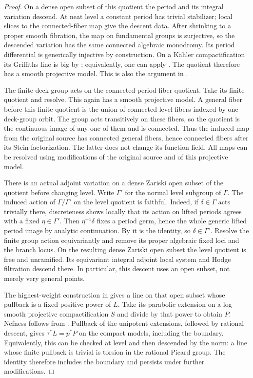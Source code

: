 \begin{proof}
On a dense open subset of this quotient the period and its integral
variation descend.  At neat level a constant period has trivial
stabilizer; local slices to the connected-fiber map give the descent
data.  After shrinking to a proper smooth fibration, the map on
fundamental groups is surjective, so the descended variation has
the same connected algebraic monodromy.  Its period differential is
generically injective by construction.  On a Kähler compactification
its Griffiths line is big by ; equivalently,
one can apply \cite[Corollary~1.3]{BrunebarbeCadorel}.  The quotient
therefore has a smooth projective model.  This is also the argument
in \cite[proof of Corollary~2.22]{VilladsenHodgeKahler}.

The finite deck group acts on the connected-period-fiber quotient.
Take its finite quotient and resolve.  This again has a smooth
projective model.  A general fiber before this finite quotient is
the union of connected level fibers indexed by one deck-group orbit.
The group acts transitively on these fibers, so the quotient is the
continuous image of any one of them and is connected.  Thus the
induced map from the original source has connected general fibers,
hence connected fibers after its Stein factorization.  The latter
does not change its function field.
All maps can be resolved using modifications of the original
source and of this projective model.

There is an actual adjoint variation on a dense Zariski open subset
of the quotient before changing level.  Write $\Gamma'$ for the
normal level subgroup of $\Gamma$.  The induced action of
$\Gamma/\Gamma'$ on the level quotient is faithful.  Indeed, if
$\delta\in\Gamma$ acts trivially there, discreteness shows locally
that its action on lifted periods agrees with a fixed
$\eta\in\Gamma'$.  Then $\eta^{-1}\delta$ fixes a period germ,
hence the whole generic lifted period image by analytic
continuation.  By  it is the identity,
so $\delta\in\Gamma'$.  Resolve the finite group action
equivariantly and remove its proper algebraic fixed loci and the
branch locus.  On the resulting dense Zariski open subset the level
quotient is free and unramified.  Its equivariant integral adjoint
local system and Hodge filtration descend there.  In particular,
this descent uses an open subset, not merely very general points.

The highest-weight construction in
 gives a line on that open subset
whose pullback is a fixed positive power of $L$.  Take its
parabolic extension on a log smooth projective compactification
$S$ and divide by that power to obtain $P$.  Nefness follows from
.  Pullback of the unipotent extensions,
followed by rational descent, gives
$\tau^*L=p^*P$ on the compact models, including the boundary.
Equivalently, this can be checked at level and then descended by
the norm: a line whose finite pullback is trivial is torsion in
the rational Picard group.  The identity therefore includes the
boundary and persists under further modifications.


\end{proof}
